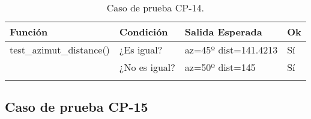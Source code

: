 \begin{longtable}[]{@{}llll@{}}
\toprule
\begin{minipage}[b]{0.6\columnwidth}\raggedright\strut
Función\strut
\end{minipage} & \begin{minipage}[b]{0.20\columnwidth}\raggedright\strut
Condición\strut
\end{minipage} & \begin{minipage}[b]{0.15\columnwidth}\raggedright\strut
Salida Esperada\strut
\end{minipage} & \begin{minipage}[b]{0.05\columnwidth}\raggedright\strut
Ok\strut
\end{minipage}\tabularnewline
\midrule
\endhead
\begin{minipage}[t]{0.6\columnwidth}\raggedright\strut
\small{test\_azimut\_distance()}\strut
\end{minipage} & \begin{minipage}[t]{0.20\columnwidth}\raggedright\strut
¿Es igual?\strut
\end{minipage} & \begin{minipage}[t]{0.15\columnwidth}\raggedright\strut
az=45º dist=141.4213\strut
\end{minipage} & \begin{minipage}[t]{0.05\columnwidth}\raggedright\strut
Sí\strut
\end{minipage}\tabularnewline
\begin{minipage}[t]{0.6\columnwidth}\raggedright\strut
\strut
\end{minipage} & \begin{minipage}[t]{0.20\columnwidth}\raggedright\strut
¿No es igual?\strut
\end{minipage} & \begin{minipage}[t]{0.15\columnwidth}\raggedright\strut
az=50º dist=145\strut
\end{minipage} & \begin{minipage}[t]{0.05\columnwidth}\raggedright\strut
Sí\strut
\end{minipage}\tabularnewline

\bottomrule
\caption{Caso de prueba CP-14.}
\end{longtable}



\subsection{Caso de prueba CP-15}

